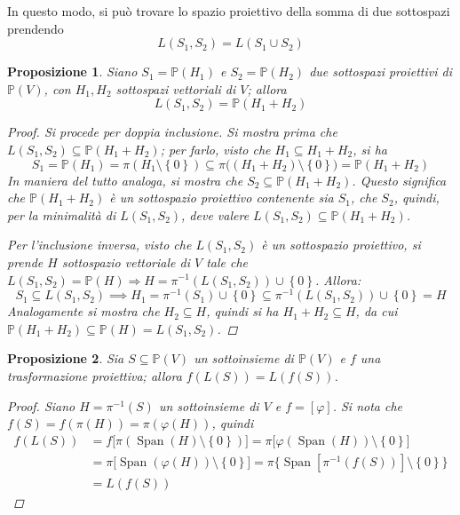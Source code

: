 \documentclass[12pt]{scrartcl}
\theoremstyle{style}
\newtheorem{prop}{Proposizione}[section]
\numberwithin{equation}{subsection}
\begin{document}
In questo modo, si pu\`o trovare lo spazio proiettivo della somma di due sottospazi prendendo 
\begin{equation}
	L(S_1,S_2) = L(S_1\cup S_2)
\end{equation}
\begin{prop}
	Siano $S_1 = \mathbb{P}(H_1)$ e $S_2 = \mathbb{P}(H_2)$ due sottospazi proiettivi di $\mathbb{P}(V)$, con $H_1,H_2$ sottospazi vettoriali di $V$; allora
	\[
	L(S_1,S_2) = \mathbb{P}(H_1+H_2)
	\] 
	\begin{proof}
		Si procede per doppia inclusione. 
		Si mostra prima che $L(S_1,S_2) \subseteq \mathbb{P}(H_1+H_2)$; per farlo, visto che $H_1 \subseteq H_1 +H_2$, si ha
		\[
		S_1 = \mathbb{P}(H_1) = \pi(H_1\setminus\left\{ 0 \right\} ) \subseteq \pi\big((H_1+H_2) \setminus\left\{ 0 \right\} \big) = \mathbb{P}(H_1+H_2)
		\] 
		In maniera del tutto analoga, si mostra che $S_2 \subseteq \mathbb{P}(H_1+H_2)$.
		Questo significa che $\mathbb{P}(H_1+H_2)$ \`e un sottospazio proiettivo contenente sia $S_1$, che $S_2$, quindi, per la minimalit\`a di $L(S_1,S_2)$, deve valere $L(S_1,S_2) \subseteq \mathbb{P}(H_1+H_2)$.

		Per l'inclusione inversa, visto che $L(S_1,S_2)$ \`e un sottospazio proiettivo, si prende $H$ sottospazio vettoriale di $V$ tale che $L(S_1,S_2) = \mathbb{P}(H)\Rightarrow H = \pi^{-1} (L(S_1,S_2)) \cup \left\{ 0 \right\} $.
		Allora:
		\[
		S_1 \subseteq L(S_1,S_2) \implies H_1 = \pi^{-1} (S_1) \cup \left\{ 0 \right\} \subseteq \pi^{-1} (L(S_1,S_2)) \cup \left\{ 0  \right\} =H
		\] 
		Analogamente si mostra che $H_2\subseteq H$, quindi si ha $H_1+H_2 \subseteq H$, da cui $\mathbb{P}(H_1+H_2) \subseteq \mathbb{P}(H) = L(S_1,S_2)$.
	\end{proof}
\end{prop}
\begin{prop}
	Sia $S \subseteq \mathbb{P}(V)$ un sottoinsieme di $\mathbb{P}(V)$ e $f$ una trasformazione proiettiva; allora $f(L(S)) = L(f(S))$.
	\begin{proof}
		Siano $H = \pi^{-1} (S)$ un sottoinsieme di $V$ e $f = [\varphi ]$.
		Si nota che $f(S) = f(\pi(H)) = \pi(\varphi (H))$, quindi
		\[
		\begin{split}
			f(L(S)) &= f\big[\pi (\operatorname{Span} (H) \setminus \left\{ 0 \right\} )\big] = \pi\big[ \varphi (\operatorname{Span} (H)) \setminus\left\{ 0 \right\} \big]\\
				&= \pi\big[\operatorname{Span} (\varphi (H))\setminus\left\{ 0 \right\}  \big]=\pi\big\{\operatorname{Span} [\pi^{-1} (f(S))] \setminus\left\{ 0 \right\} \big\}\\
				&=L(f(S))
		\end{split}
		\] 
	\end{proof}
\end{prop}
\end{document}
